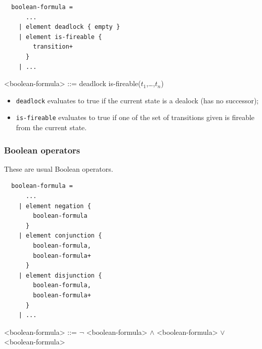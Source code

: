 \documentclass[10pt,english,a4paper]{article}
\begin{document}
\begin{multicols}{2}
\begin{lstlisting}
  boolean-formula =
      ...
    | element deadlock { empty }
    | element is-fireable {
        transition+
      }
    | ...
\end{lstlisting}
\columnbreak
\begin{grammar}
<boolean-formula> ::= deadlock
\alt is-fireable($t_1$,\dots,$t_n$)
\end{grammar}
\end{multicols}


\begin{itemize}
  \item \lstinline!deadlock! evaluates to true if the current state is a dealock
    (has no successor);
  \item \lstinline!is-fireable! evaluates to true if one of the set of transitions given
    is fireable from the current state.
\end{itemize}

\subsubsection{Boolean operators}

These are usual Boolean operators.


\begin{multicols}{2}
\begin{lstlisting}
  boolean-formula =
      ...
    | element negation {
        boolean-formula
      }
    | element conjunction {
        boolean-formula,
        boolean-formula+
      }
    | element disjunction {
        boolean-formula,
        boolean-formula+
      }
    | ...
\end{lstlisting}
\columnbreak
\begin{grammar}
<boolean-formula> ::= $\lnot$ <boolean-formula>
 $\wedge$ <boolean-formula>
 $\vee$ <boolean-formula>
\end{grammar}
\end{multicols}
\end{document}
